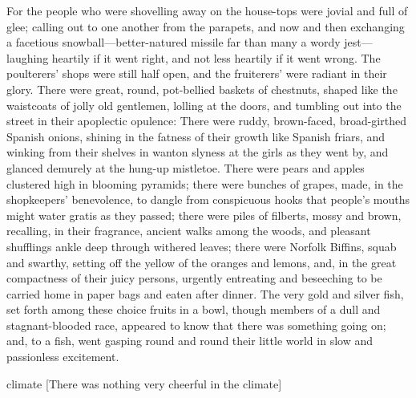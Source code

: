 For the people who were shovelling away on the house-tops were jovial and full
of glee; calling out to one another from the parapets, and now and then
exchanging a facetious snowball—better-natured missile far than many a wordy
jest—laughing heartily if it went right, and not less heartily if it went wrong.
The poulterers' shops were still half open, and the fruiterers' were radiant in
their glory. There were great, round, pot-bellied baskets of chestnuts, shaped
like the waistcoats of jolly old gentlemen, lolling at the doors, and tumbling
out into the street in their apoplectic opulence: There were ruddy, brown-faced,
broad-girthed Spanish onions, shining in the fatness of their growth like
Spanish friars, and winking from their shelves in wanton slyness at the girls as
they went by, and glanced demurely at the hung-up mistletoe. There were pears
and apples clustered high in blooming pyramids; there were bunches of grapes,
made, in the shopkeepers' benevolence, to dangle from conspicuous hooks that
people's mouths might water gratis as they passed; there were piles of filberts,
mossy and brown, recalling, in their fragrance, ancient walks among the woods,
and pleasant shufflings ankle deep through withered leaves; there were Norfolk
Biffins, squab and swarthy, setting off the yellow of the oranges and lemons,
and, in the great compactness of their juicy persons, urgently entreating and
beseeching to be carried home in paper bags and eaten after dinner. The very
gold and silver fish, set forth among these choice fruits in a bowl, though
members of a dull and stagnant-blooded race, appeared to know that there was
something going on; and, to a fish, went gasping round and round their little
world in slow and passionless excitement.


  \begin{bwbigpic}
    [\basicscale] 
    {climate}
    [There was nothing very cheerful in the climate]
  \end{bwbigpic}



